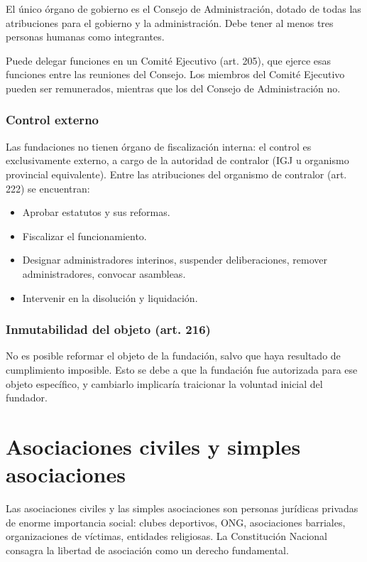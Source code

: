 \documentclass[12pt,oneside]{book}
\begin{document}
El único órgano de gobierno es el Consejo de Administración, dotado de todas las atribuciones para el gobierno y la administración. Debe tener al menos tres personas humanas como integrantes.

Puede delegar funciones en un Comité Ejecutivo (art. 205), que ejerce esas funciones entre las reuniones del Consejo. Los miembros del Comité Ejecutivo pueden ser remunerados, mientras que los del Consejo de Administración no.

\subsection{Control externo}

Las fundaciones no tienen órgano de fiscalización interna: el control es exclusivamente externo, a cargo de la autoridad de contralor (IGJ u organismo provincial equivalente). Entre las atribuciones del organismo de contralor (art. 222) se encuentran:

\begin{itemize}
    \item Aprobar estatutos y sus reformas.
    \item Fiscalizar el funcionamiento.
    \item Designar administradores interinos, suspender deliberaciones, remover administradores, convocar asambleas.
    \item Intervenir en la disolución y liquidación.
\end{itemize}

\subsection{Inmutabilidad del objeto (art. 216)}

No es posible reformar el objeto de la fundación, salvo que haya resultado de cumplimiento imposible. Esto se debe a que la fundación fue autorizada para ese objeto específico, y cambiarlo implicaría traicionar la voluntad inicial del fundador.

\chapter{Asociaciones civiles y simples asociaciones}

Las asociaciones civiles y las simples asociaciones son personas jurídicas privadas de enorme importancia social: clubes deportivos, ONG, asociaciones barriales, organizaciones de víctimas, entidades religiosas. La Constitución Nacional consagra la libertad de asociación como un derecho fundamental.
\end{document}
